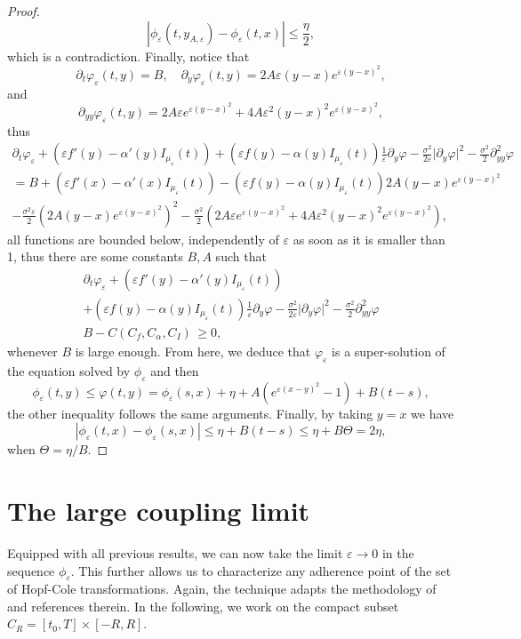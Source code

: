 \documentclass[onefignum,onetabnum]{siamart190516}
\newcommand{\1}{\mathbbm{1}}
\newcommand{\eps}{\varepsilon}
\begin{document}
\begin{proof}
$$
|\phi_\eps(t,y_{A,\eps})-\phi_\eps(t,x)|\leq \frac{\eta}2,
$$
which is a contradiction. Finally, notice that
$$
\partial_t\varphi_\eps(t,y)=B,\quad \partial_y\varphi_\eps(t,y)=2A\eps(y-x)e^{\eps(y-x)^2},$$
and
$$
\partial_{yy}\varphi_\eps(t,y)=2A\eps e^{\eps(y-x)^2}+4A\eps^2(y-x)^2e^{\eps(y-x)^2},
$$
thus
\begin{multline*}
\partial_t\varphi_\eps +\left(\eps f'(y) - \alpha'(y)I_{\mu_\eps}(t) \right)
+  \left(\eps f(y)- \alpha(y) I_{\mu_\eps}(t)\right)\frac{1}{\eps}\partial_y\varphi - \frac{\sigma^2}{2\eps} \vert \partial_y\varphi \vert^2  - \frac {\sigma^2}{2} \partial_{yy}^2 \varphi
\\
=
B+\left(\eps f'(x) - \alpha'(x)I_{\mu_\eps}(t) \right)
-  \left(\eps f(y)- \alpha(y) I_{\mu_\eps}(t)\right)2A(y-x)e^{\eps(y-x)^2}
\\
- \frac{\sigma^2\eps}{2} \left(2A(y-x)e^{\eps(y-x)^2}\right)^2
-\frac{\sigma^2}{2}\left(2A\eps e^{\eps(y-x)^2}+4A\eps^2(y-x)^2e^{\eps(y-x)^2}\right),
\end{multline*}
all functions are bounded below, independently of $\eps$ as soon as it is smaller than 1, thus there are some constants $B, A$ such that
\begin{multline*}
\partial_t\varphi_\eps +\left(\eps f'(y) - \alpha'(y)I_{\mu_\eps}(t) \right)
\\
+  \left(\eps f(y)- \alpha(y) I_{\mu_\eps}(t)\right)\frac{1}{\eps}\partial_y\varphi - \frac{\sigma^2}{2\eps} \vert \partial_y\varphi \vert^2  - \frac {\sigma^2}{2} \partial_{yy}^2 \varphi
\\
B-C(C_f,C_\alpha,C_I)\,\geq 0,
\end{multline*}
whenever $B$ is large enough. From here, we deduce that $\varphi_\eps$ is a super-solution of the equation solved by $\phi_\eps$ and then
$$
\phi_\eps(t,y) \leq \varphi(t,y)=\phi_\eps(s,x)+\eta+A(e^{\eps(x-y)^2}-1) +B(t-s),
$$
the other inequality follows the same arguments. Finally, by taking  $y=x$ we have
$$
|\phi_\eps(t,x)-\phi_\eps(s,x)|\leq \eta+B(t-s)\leq \eta+B\Theta=2\eta,
$$
when $\Theta=\eta/B$.
\end{proof}

\section{The large coupling limit}
\label{sec:limit}

Equipped with all previous results, we can now take the limit $\eps\rightarrow0$ in the sequence $\phi_\eps$. This further allows us to characterize any adherence point of the set of Hopf-Cole transformations. Again, the technique adapts the methodology of~\cite{barles2009concentration} and references therein. In the following, we work on the compact subset $C_R=[t_0,T]\times [-R,R]$.
\end{document}

